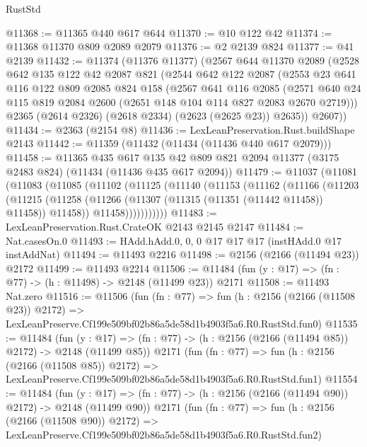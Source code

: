 \begin{lexlean}{RustStd}
\begin{coremodule}
@11368 := @11365 @440 @617 @644
@11370 := @10 @122 @42
@11374 := @11368 @11370 @809 @2089 @2079
@11376 := @2 @2139 @824
@11377 := @41 @2139
@11432 := @11374
    (@11376 @11377)
    (@2567
      @644
      @11370
      @2089
      (@2528
        @642
        @135
        @122
        @42
        @2087
        @821
        (@2544
          @642
          @122
          @2087
          (@2553
            @23
            @641
            @116
            @122
            @809
            @2085
            @824
            @158
            (@2567
              @641
              @116
              @2085
              (@2571 @640 @24 @115 @819 @2084 @2600 (@2651 @148 @104 @114 @827 @2083 @2670 @2719)))
            @2365
            (@2614 @2326)
            (@2618 @2334)
            (@2623 (@2625 @23))
            @2635))
        @2607))
@11434 := @2363 (@2154 @8)
@11436 := LexLeanPreservation.Rust.buildShape @2143
@11442 := @11359 (@11432 (@11434 (@11436 @440 @617 @2079)))
@11458 := @11365
    @435
    @617
    @135
    @42
    @809
    @821
    @2094
    @11377
    (@3175 @2483 @824)
    (@11434 (@11436 @435 @617 @2094))
@11479 := @11037
    (@11081
      (@11083
        (@11085
          (@11102
            (@11125
              (@11140
                (@11153
                  (@11162
                    (@11166
                      (@11203
                        (@11215
                          (@11258 (@11266 (@11307 (@11315 (@11351 (@11442 @11458)) @11458)) @11458))
                          @11458)))))))))))
@11483 := LexLeanPreservation.Rust.CrateOK @2143 @2145 @2147
@11484 := Nat.casesOn.{0}
@11493 := HAdd.hAdd.{0, 0, 0} @17 @17 @17 (instHAdd.{0} @17 instAddNat)
@11494 := @11493 @2216
@11498 := @2156 (@2166 (@11494 @23)) @2172
@11499 := @11493 @2214
@11506 := @11484 (fun (y : @17) => (fn : @77) -> (h : @11498) -> @2148 (@11499 @23)) @2171
@11508 := @11493 Nat.zero
@11516 := @11506
    (fun (fn : @77) =>
    fun (h : @2156 (@2166 (@11508 @23)) @2172) =>
    LexLeanPreserve.Cf199e509bf02b86a5de58d1b4903f5a6.R0.RustStd.fun0)
@11535 := @11484
    (fun (y : @17) => (fn : @77) -> (h : @2156 (@2166 (@11494 @85)) @2172) -> @2148 (@11499 @85))
    @2171
    (fun (fn : @77) =>
    fun (h : @2156 (@2166 (@11508 @85)) @2172) =>
    LexLeanPreserve.Cf199e509bf02b86a5de58d1b4903f5a6.R0.RustStd.fun1)
@11554 := @11484
    (fun (y : @17) => (fn : @77) -> (h : @2156 (@2166 (@11494 @90)) @2172) -> @2148 (@11499 @90))
    @2171
    (fun (fn : @77) =>
    fun (h : @2156 (@2166 (@11508 @90)) @2172) =>
    LexLeanPreserve.Cf199e509bf02b86a5de58d1b4903f5a6.R0.RustStd.fun2)

\end{coremodule}
\end{lexlean}
